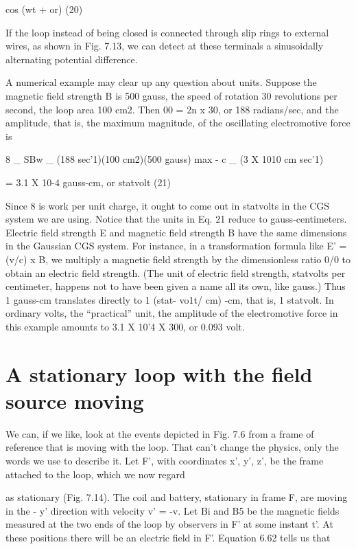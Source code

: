 cos (wt + or) (20)

If the loop instead of being closed is connected through slip rings to
external wires, as shown in Fig. 7.13, we can detect at these terminals
a sinusoidally alternating potential difference.

A numerical example may clear up any question about units.
Suppose the magnetic field strength B is 500 gauss, the speed of rotation
30 revolutions per second, the loop area 100 cm2. Then
00 = 2n x 30, or 188 radians/sec, and the amplitude, that is, the
maximum magnitude, of the oscillating electromotive force is

8 _ SBw _ (188 sec'1)(100 cm2)(500 gauss)
max - c _ (3 X 1010 cm sec'1)

= 3.1 X 10-4 gauss-cm, or statvolt (21)

Since 8 is work per unit charge, it ought to come out in statvolts in
the CGS system we are using. Notice that the units in Eq. 21 reduce
to gauss-centimeters. Electric field strength E and magnetic field
strength B have the same dimensions in the Gaussian CGS system.
For instance, in a transformation formula like E' = (v/c) x B, we
multiply a magnetic field strength by the dimensionless ratio 0/0 to
obtain an electric field strength. (The unit of electric field strength,
statvolts per centimeter, happens not to have been given a name all
its own, like gauss.) Thus 1 gauss-cm translates directly to 1 (stat-
vo1t/ cm) -cm, that is, 1 statvolt. In ordinary volts, the ``practical''
unit, the amplitude of the electromotive force in this example
amounts to 3.1 X 10'4 X 300, or 0.093 volt.

\section{A stationary loop with the field source moving}

We can, if we like, look at the events depicted in Fig. 7.6 from a
frame of reference that is moving with the loop. That can't change
the physics, only the words we use to describe it. Let F', with coordinates
x', y', z', be the frame attached to the loop, which we now regard

as stationary (Fig. 7.14). The coil and battery, stationary in frame F,
are moving in the - y' direction with velocity v' = -v. Let Bi and
B5 be the magnetic fields measured at the two ends of the loop by
observers in F' at some instant t'. At these positions there will be
an electric field in F'. Equation 6.62 tells us that


